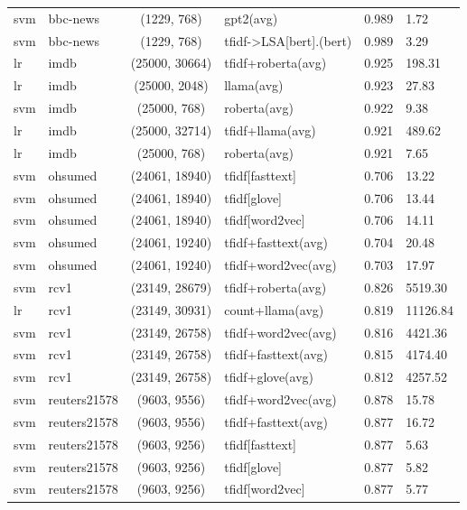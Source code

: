 \documentclass[final]{clv2025-revised}
\begin{document}
\begin{table}[h!]
\begin{tabular}{@{}p{.7cm} p{1.8cm} c >{\raggedright\arraybackslash}p{5.8cm} r p{1.0cm}@{}}
svm & bbc-news & (1229, 768) & gpt2(avg) & 0.989 & 1.72 \\
svm & bbc-news & (1229, 768) & tfidf->LSA[bert].(bert) & 0.989 & 3.29 \\
\midrule
lr & imdb & (25000, 30664) & tfidf+roberta(avg) & 0.925 & 198.31 \\
lr & imdb & (25000, 2048) & llama(avg) & 0.923 & 27.83 \\
svm & imdb & (25000, 768) & roberta(avg) & 0.922 & 9.38 \\
lr & imdb & (25000, 32714) & tfidf+llama(avg) & 0.921 & 489.62 \\
lr & imdb & (25000, 768) & roberta(avg) & 0.921 & 7.65 \\
\midrule
svm & ohsumed & (24061, 18940) & tfidf[fasttext] & 0.706 & 13.22 \\
svm & ohsumed & (24061, 18940) & tfidf[glove] & 0.706 & 13.44 \\
svm & ohsumed & (24061, 18940) & tfidf[word2vec] & 0.706 & 14.11 \\
svm & ohsumed & (24061, 19240) & tfidf+fasttext(avg) & 0.704 & 20.48 \\
svm & ohsumed & (24061, 19240) & tfidf+word2vec(avg) & 0.703 & 17.97 \\
\midrule
svm & rcv1 & (23149, 28679) & tfidf+roberta(avg) & 0.826 & 5519.30 \\
lr & rcv1 & (23149, 30931) & count+llama(avg) & 0.819 & 11126.84 \\
svm & rcv1 & (23149, 26758) & tfidf+word2vec(avg) & 0.816 & 4421.36 \\
svm & rcv1 & (23149, 26758) & tfidf+fasttext(avg) & 0.815 & 4174.40 \\
svm & rcv1 & (23149, 26758) & tfidf+glove(avg) & 0.812 & 4257.52 \\
\midrule
svm & reuters21578 & (9603, 9556) & tfidf+word2vec(avg) & 0.878 & 15.78 \\
svm & reuters21578 & (9603, 9556) & tfidf+fasttext(avg) & 0.877 & 16.72 \\
svm & reuters21578 & (9603, 9256) & tfidf[fasttext] & 0.877 & 5.63 \\
svm & reuters21578 & (9603, 9256) & tfidf[glove] & 0.877 & 5.82 \\
svm & reuters21578 & (9603, 9256) & tfidf[word2vec] & 0.877 & 5.77 \\
\bottomrule
\end{tabular}
\end{table}
\end{document}
